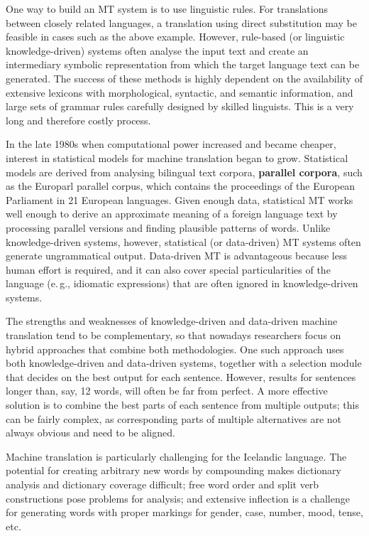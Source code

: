 \begin{multicols}{2}
One way to build an MT system is to use linguistic rules. For translations between closely related languages, a translation using direct substitution may be feasible in cases such as the above example. However, rule-based (or linguistic knowledge-driven) systems often analyse the input text and create an intermediary symbolic representation from which the target language text can be generated. The success of these methods is highly dependent on the availability of extensive lexicons with morphological, syntactic, and semantic information, and large sets of grammar rules carefully designed by skilled linguists. This is a very long and therefore costly process.

In the late 1980s when computational power increased and became cheaper, interest in statistical models for machine translation began to grow. Statistical models are derived from analysing bilingual text corpora, \textbf{parallel corpora}, such as the Europarl parallel corpus, which contains the proceedings of the European Parliament in 21 European languages. Given enough data, statistical MT works well enough to derive an approximate meaning of a foreign language text by processing parallel versions and finding plausible patterns of words. Unlike knowledge-driven systems, however, statistical (or data-driven) MT systems often generate ungrammatical output. Data-driven MT is advantageous because less human effort is required, and it can also cover special particularities of the language (e.\,g., idiomatic expressions) that are often ignored in knowledge-driven systems. 

The strengths and weaknesses of knowledge-driven and data-driven machine translation tend to be complementary, so that nowadays researchers focus on hybrid approaches that combine both methodologies. One such approach uses both knowledge-driven and data-driven systems, together with a selection module that decides on the best output for each sentence. However, results for sentences longer than, say, 12 words, will often be far from perfect. A more effective solution is to combine the best parts of each sentence from multiple outputs; this can be fairly complex, as corresponding parts of multiple alternatives are not always obvious and need to be aligned. 


Machine translation is particularly challenging for the Icelandic language. The potential for creating arbitrary new words by compounding makes dictionary analysis and dictionary coverage difficult; free word order and split verb constructions pose problems for analysis; and extensive inflection is a challenge for generating words with proper markings for gender, case, number, mood, tense, etc.


\end{multicols}
